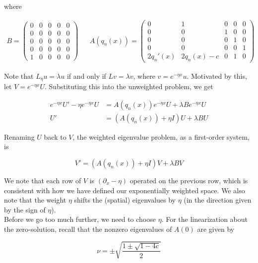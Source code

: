 \documentclass[12pt]{article}
\begin{document}
where

\begin{align*}
B = \begin{pmatrix}0 & 0 & 0 & 0 & 0 \\0 & 0 & 0 & 0 & 0 \\0  & 0 & 0 & 0 & 0 \\0 & 0 & 0 & 0 & 0 \\1 & 0 & 0 & 0 & 0 \end{pmatrix} && 
A(q_n(x)) = \begin{pmatrix}0 & 1 & 0 & 0 & 0 \\0 & 0 & 1 & 0 & 0 \\0 & 0 & 0 & 1 & 0 \\0 & 0 & 0 & 0 & 1 \\
2q_n'(x) & 2q_n(x) - c & 0 & 1 & 0 \end{pmatrix} 
\end{align*}

Note that $L_\eta u = \lambda u$ if and only if $L v = \lambda v$, where $v = e^{-\eta x} u$. Motivated by this, let $V = e^{-\eta x} U$. Substituting this into the unweighted problem, we get

\begin{align*}
e^{-\eta x} U' - \eta e^{-\eta x}U &= A(q_n(x))e^{-\eta x}U + \lambda B e^{-\eta x}U \\
U' &= (A(q_n(x)) + \eta I) U + \lambda B U
\end{align*}

Renaming $U$ back to $V$, the weighted eigenvalue problem, as a first-order system, is

\begin{equation}\label{weightedeig}
V' = (A(q_n(x)) + \eta I)V + \lambda B V
\end{equation}

We note that each row of $V$ is $(\partial_x - \eta)$ operated on the previous row, which is consistent with how we have defined our exponentially weighted space. We also note that the weight $\eta$ shifts the (spatial) eigenvalues by $\eta$ (in the direction given by the sign of $\eta$).\\

Before we go too much further, we need to choose $\eta$. For the linearization about the zero-solution, recall that the nonzero eigenvalues of $A(0)$ are given by

\[
\nu = \pm \sqrt{ \frac{1 \pm \sqrt{1 - 4c} }{2}}
\]
\end{document}
